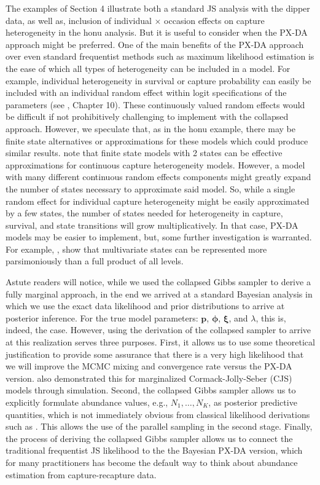 \documentclass[11pt]{article}
\newcommand{\bp}{\ensuremath{\mathbf{p}}}
\newcommand{\bxi}{\ensuremath{\boldsymbol{\xi}}}
\newcommand{\bphi}{\ensuremath{\boldsymbol{\phi}}}
\begin{document}
The examples of Section 4 illustrate both a standard JS analysis with the dipper data, as well as, inclusion of individual $\times$ occasion effects on capture heterogeneity in the honu analysis. But it is useful to consider when the PX-DA approach might be preferred. One of the main benefits of the PX-DA approach over even standard frequentist methods such as maximum likelihood estimation is the ease of which all types of heterogeneity can be included in a model. For example, individual heterogeneity in survival or capture probability can easily be included with an individual random effect within logit specifications of the parameters (see \citealt{Royle:2008kx}, Chapter 10). These continuously valued random effects would be difficult if not prohibitively challenging to implement with the collapsed approach. However, we speculate that, as in the honu example, there may be finite state alternatives or approximations for these models which could produce similar results. \citet{Pledger:2010fk} note that finite state models with 2 states can be effective approximations for continuous capture heterogeneity models. However, a model with many different continuous random effects components might greatly expand the number of states necessary to approximate said model. So, while a single random effect for individual capture heterogeneity might be easily approximated by a few states, the number of states needed for heterogeneity in capture, survival, and state transitions will grow multiplicatively. In that case, PX-DA models may be easier to implement, but, some further investigation is warranted. For example, \citet{johnson2016multivariate}, show that multivariate states can be represented more parsimoniously than a full product of all levels. 

Astute readers will notice, while we used the collapsed Gibbs sampler to derive a fully marginal approach, in the end we arrived at a standard Bayesian analysis in which we use the exact data likelihood and prior distributions to arrive at posterior inference. For the true model parameters: $\bp$, $\bphi$, $\bxi$, and $\lambda$, this is, indeed, the case. However, using the derivation of the collapsed sampler to arrive at this realization serves three purposes. First, it allows us to use some theoretical justification to provide some assurance that there is a very high likelihood that we will improve the MCMC mixing and convergence rate versus the PX-DA version. \cite{yackulic2020need} also demonstrated this for marginalized Cormack-Jolly-Seber (CJS) models through simulation. Second, the collapsed Gibbs sampler allows us to explicitly formulate abundance values, e.g., $N_1,\dots,N_K$, as posterior predictive quantities, which is not immediately obvious from classical likelihood derivations such as \cite{schwarz1996general}. This allows the use of the parallel sampling in the second stage. Finally, the process of deriving the collapsed Gibbs sampler allows us to connect the traditional frequentist JS likelihood to the the Bayesian PX-DA version, which for many practitioners has become the default way to think about abundance estimation from capture-recapture data. 
\end{document}
